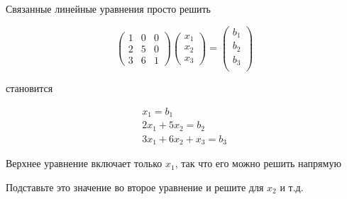\begin{frame}

    \vspace{2em}
    Связанные линейные уравнения просто решить 

  \vspace{0.7em}

    \Eg
    \begin{equation*}
        \left(
        \begin{array}{ccc}
            1 & 0 & 0  \\
            2 & 5 & 0 \\
            3 & 6 & 1
        \end{array}
        \right)
        \left(
        \begin{array}{ccc}
            x_1 \\
            x_2 \\
            x_3 
        \end{array}
        \right)
        =
        \left(
        \begin{array}{c}
            b_1 \\
            b_2 \\
            b_3 \\
        \end{array}
        \right)
    \end{equation*}
    
    становится

    \begin{equation*}
        \begin{array}{c}
            x_1  = b_1  \\
            2x_1 + 5x_2 = b_2 \\
            3x_1 + 6x_2 + x_3 = b_3
        \end{array}
    \end{equation*}

    Верхнее уравнение включает только $x_1$, так что его можно решить напрямую

    Подставьте это значение во второе уравнение и решите для $x_2$ и т.д.

\end{frame}


